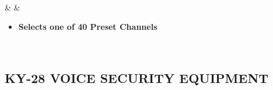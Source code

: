 \documentclass[fontInter]{TechCheck}
\begin{document}
\begin{listlongtable}
\begin{minipage}[t]{\linewidth}
\begin{itemize}
\begin{itemize}
				\end{itemize}
			\end{itemize}
		\end{minipage} \\
		\midrule
		\textbf{\textbullet} &   &
		\begin{minipage}[t]{\linewidth}
			\vspace{-7pt}
			\begin{itemize}
				\item \textbf{Selects one of 40 Preset Channels}
			\end{itemize}
		\end{minipage} \\
	\end{listlongtable}

	\subsection{KY-28 VOICE SECURITY EQUIPMENT}
\end{document}
